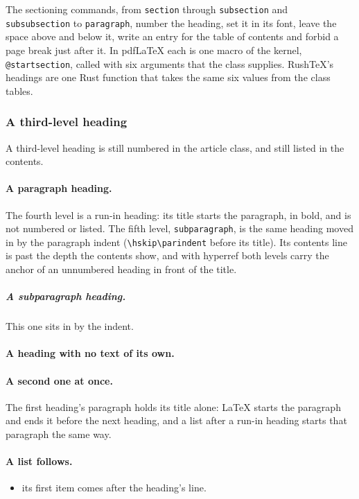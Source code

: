\documentclass{article}
\numberwithin{equation}{section}
\theoremstyle{definition}
\theoremstyle{remark}
\begin{document}
The sectioning commands, from \texttt{section} through \texttt{subsection} and
\texttt{subsubsection} to \texttt{paragraph}, number the heading, set it in its font,
leave the space above and below it, write an entry for the table of contents and forbid
a page break just after it. In pdfLaTeX each is one macro of the kernel,
\texttt{@startsection}, called with six arguments that the class supplies. RushTeX's
headings are one Rust function that takes the same six values from the class tables.

\subsubsection{A third-level heading}

A third-level heading is still numbered in the article class, and still listed in the
contents.

\paragraph{A paragraph heading.} The fourth level is a run-in heading: its title starts
the paragraph, in bold, and is not numbered or listed. The fifth level,
\texttt{subparagraph}, is the same heading moved in by the paragraph indent
(\texttt{\textbackslash hskip\textbackslash parindent} before its title). Its contents
line is past the depth the contents show, and with hyperref both levels carry the anchor
of an unnumbered heading in front of the title.

\subparagraph{A subparagraph heading.} This one sits in by the indent.

\paragraph{A heading with no text of its own.}
\paragraph{A second one at once.} The first heading's paragraph holds its title alone:
\LaTeX{} starts the paragraph and ends it before the next heading, and a list after a
run-in heading starts that paragraph the same way.
\paragraph{A list follows.}
\begin{itemize}
\item its first item comes after the heading's line.
\end{itemize}
\end{document}
